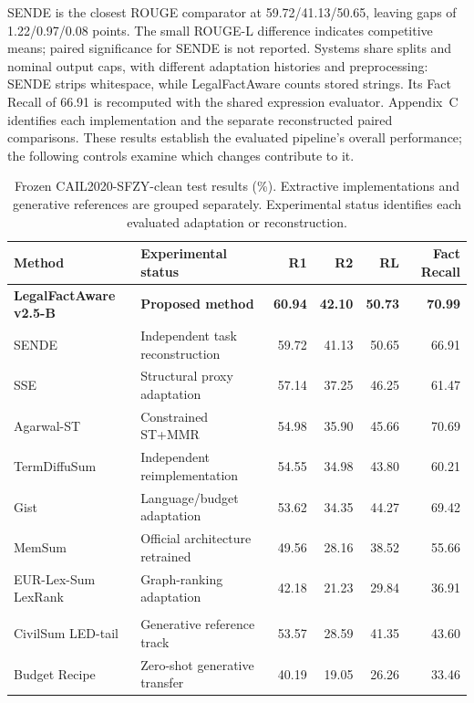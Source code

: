 \documentclass[10pt,twocolumn,letterpaper]{article}
\begin{document}
SENDE is the closest ROUGE comparator at 59.72/41.13/50.65, leaving gaps of 1.22/0.97/0.08 points. The small ROUGE-L difference indicates competitive means; paired significance for SENDE is not reported. Systems share splits and nominal output caps, with different adaptation histories and preprocessing: SENDE strips whitespace, while LegalFactAware counts stored strings. Its Fact Recall of 66.91 is recomputed with the shared expression evaluator. Appendix~C identifies each implementation and the separate reconstructed paired comparisons. These results establish the evaluated pipeline's overall performance; the following controls examine which changes contribute to it.
\begin{table}[!t]
\caption{Frozen CAIL2020-SFZY-clean test results (\%). Extractive implementations and generative references are grouped separately. Experimental status identifies each evaluated adaptation or reconstruction.}\label{tab:1}
\begin{tabularx}{\textwidth}{@{}>{\raggedright\arraybackslash}p{}>{\raggedright\arraybackslash}Xrrrr@{}}
\toprule
\textbf{Method} & \textbf{Experimental status} & \textbf{R1} & \textbf{R2} & \textbf{RL} & \textbf{Fact Recall} \\
\midrule
\textbf{LegalFactAware v2.5-B} & \textbf{Proposed method} & \textbf{60.94} & \textbf{42.10} & \textbf{50.73} & \textbf{70.99} \\
SENDE & Independent task reconstruction & 59.72 & 41.13 & 50.65 & 66.91 \\
SSE & Structural proxy adaptation & 57.14 & 37.25 & 46.25 & 61.47 \\
Agarwal-ST & Constrained ST+MMR & 54.98 & 35.90 & 45.66 & 70.69 \\
TermDiffuSum & Independent reimplementation & 54.55 & 34.98 & 43.80 & 60.21 \\
Gist & Language/budget adaptation & 53.62 & 34.35 & 44.27 & 69.42 \\
MemSum & Official architecture retrained & 49.56 & 28.16 & 38.52 & 55.66 \\
EUR-Lex-Sum LexRank & Graph-ranking adaptation & 42.18 & 21.23 & 29.84 & 36.91 \\
\midrule
\multicolumn{6}{@{}l}{\textit{Generative reference systems}} \\
CivilSum LED-tail & Generative reference track & 53.57 & 28.59 & 41.35 & 43.60 \\
Budget Recipe & Zero-shot generative transfer & 40.19 & 19.05 & 26.26 & 33.46 \\
\bottomrule
\end{tabularx}
\end{table}
\end{document}
